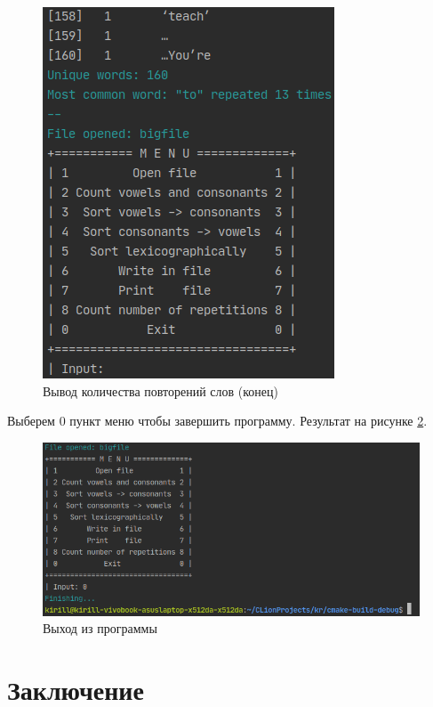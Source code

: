 \documentclass[12pt,a4paper]{article}  %
\begin{document}
\begin{figure}[htp!]
	\centering
	\includegraphics[width=0.5\linewidth]{photo/tests/cnor2}
	\caption{Вывод количества повторений слов (конец)}
	\label{cnor2}
\end{figure}

Выберем 0 пункт меню чтобы завершить программу. Результат на рисунке \ref{exit}.

\begin{figure}[htp!]
	\centering
	\includegraphics[width=0.5\linewidth]{photo/tests/exit}
	\caption{Выход из программы}
	\label{exit}
\end{figure}

\newpage
\section*{Заключение}
\setcounter{figure}{0}

\end{document}
